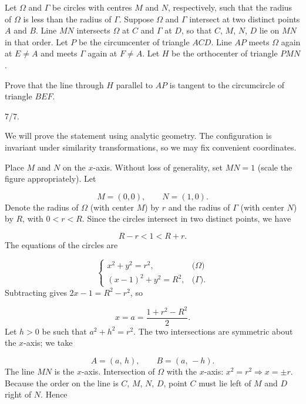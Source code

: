 \begin{mdframed}[style=mdpurplebox,frametitle={IMO 2025 Problem 2}]
Let $\Omega$ and $\Gamma$ be circles with centres $M$ and $N$, respectively,
such that the radius of $\Omega$ is less than the radius of $\Gamma$.
Suppose $\Omega$ and $\Gamma$ intersect at two distinct points $A$ and $B$.
Line $MN$ intersects $\Omega$ at $C$ and $\Gamma$ at $D$,
so that $C$, $M$, $N$, $D$ lie on $MN$ in that order.
Let $P$ be the circumcenter of triangle $ACD$.
Line $AP$ meets $\Omega$ again at $E \neq A$ and meets $\Gamma$ again at $F \neq A$.
Let $H$ be the orthocenter of triangle $PMN$.

Prove that the line through $H$ parallel to $AP$ is tangent
to the circumcircle of triangle $BEF$.
\end{mdframed}

\begin{remark*}
  7/7.
\end{remark*}
We will prove the statement using analytic geometry. The configuration is invariant under similarity transformations, so we may fix convenient coordinates.\par
{}
Place \(M\) and \(N\) on the \(x\)-axis. Without loss of generality, set \(MN = 1\) (scale the figure appropriately). Let\par
\[
M = (0,0),\qquad N = (1,0).
\]
Denote the radius of \(\Omega\) (with center \(M\)) by \(r\) and the radius of \(\Gamma\) (with center \(N\)) by \(R\), with \(0 < r < R\). Since the circles intersect in two distinct points, we have\par
\[
R - r < 1 < R + r.
\]
The equations of the circles are\par
\[
\begin{cases}
x^2 + y^2 = r^2, & \text{(\(\Omega\))}\\[2mm]
(x-1)^2 + y^2 = R^2, & \text{(\(\Gamma\))}.
\end{cases}
\]
Subtracting gives \(2x-1 = R^2 - r^2\), so\par
\[
x = a = \frac{1 + r^2 - R^2}{2}.
\]
Let \(h > 0\) be such that \(a^2 + h^2 = r^2\). The two intersections are symmetric about the \(x\)-axis; we take\par
\[
A = (a,\, h),\qquad B = (a,\, -h).
\]
The line \(MN\) is the \(x\)-axis. Intersection of \(\Omega\) with the \(x\)-axis: \(x^2 = r^2 \Rightarrow x = \pm r\). Because the order on the line is \(C\), \(M\), \(N\), \(D\), point \(C\) must lie left of \(M\) and \(D\) right of \(N\). Hence\par
